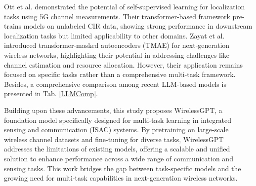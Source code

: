 Ott et al. \cite{ott2024radio} demonstrated the potential of self-supervised learning for localization tasks using 5G channel measurements. Their transformer-based framework pre-trains models on unlabeled CIR data, showing strong performance in downstream localization tasks but limited applicability to other domains. Zayat et al. \cite{zayat2023transformer} introduced transformer-masked autoencoders (TMAE) for next-generation wireless networks, highlighting their potential in addressing challenges like channel estimation and resource allocation. However, their application remains focused on specific tasks rather than a comprehensive multi-task framework. Besides, a comprehensive comparison among recent LLM-based models is presented in Tab. \ref{LLMComp}.


Building upon these advancements, this study proposes WirelessGPT, a foundation model specifically designed for multi-task learning in integrated sensing and communication (ISAC) systems. By pretraining on large-scale wireless channel datasets and fine-tuning for diverse tasks, WirelessGPT addresses the limitations of existing models, offering a scalable and unified solution to enhance performance across a wide range of communication and sensing tasks. This work bridges the gap between task-specific models and the growing need for multi-task capabilities in next-generation wireless networks.
